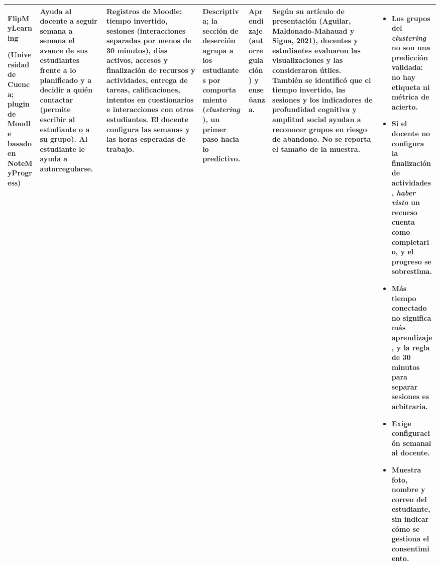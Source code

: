 \documentclass[10pt]{article}
\begin{document}
{\begin{longtable}{P{2.2cm} P{3.4cm} P{3.6cm} P{2.7cm} P{2.2cm} P{4.3cm} P{5.0cm}}
\textbf{Flip\-My\-Lear\-ning}\par (Universidad de Cuenca; plugin de Moodle basado en NoteMyProgress)
& Ayuda al \textbf{docente} a seguir semana a semana el avance de sus estudiantes frente a lo planificado y a decidir a quién contactar (permite escribir al estudiante o a su grupo). Al \textbf{estudiante} le ayuda a autorregularse.
& Registros de Moodle: tiempo invertido, sesiones (interacciones separadas por menos de 30 minutos), días activos, accesos y finalización de recursos y actividades, entrega de tareas, calificaciones, intentos en cuestionarios e interacciones con otros estudiantes. El docente configura las semanas y las horas esperadas de trabajo.
& Descriptiva; la sección de deserción agrupa a los estudiantes por comportamiento (\emph{clustering}), un primer paso hacia lo predictivo.
& Aprendizaje (autorregulación) y enseñanza.
& Según su artículo de presentación (Aguilar, Maldonado-Mahauad y Sigua, 2021), docentes y estudiantes evaluaron las visualizaciones y las consideraron útiles. También se identificó que el tiempo invertido, las sesiones y los indicadores de profundidad cognitiva y amplitud social ayudan a reconocer grupos en riesgo de abandono. No se reporta el tamaño de la muestra.
& \begin{itemize}
\item Los grupos del \emph{clustering} no son una predicción validada: no hay etiqueta ni métrica de acierto.
\item Si el docente no configura la finalización de actividades, \emph{haber visto} un recurso cuenta como completarlo, y el progreso se sobrestima.
\item Más tiempo conectado no significa más aprendizaje, y la regla de 30 minutos para separar sesiones es arbitraria.
\item Exige configuración semanal al docente.
\item Muestra foto, nombre y correo del estudiante, sin indicar cómo se gestiona el consentimiento.
\end{itemize}\\
\midrule


\end{longtable}}
\end{document}
